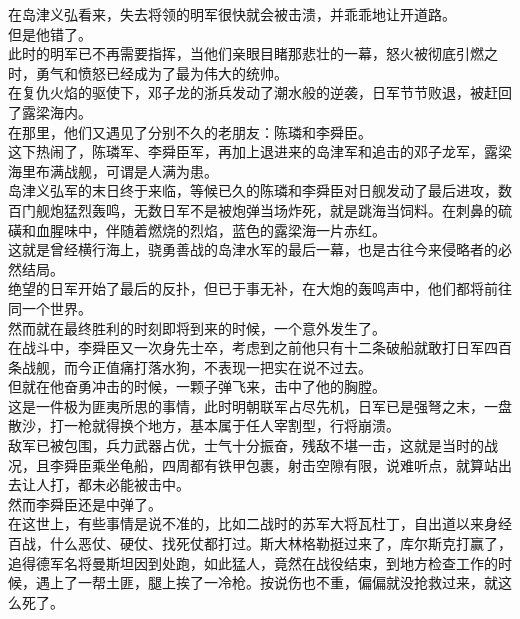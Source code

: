 \begin{multicols}{\theparacolNo}
在岛津义弘看来，失去将领的明军很快就会被击溃，并乖乖地让开道路。\\

但是他错了。\\

此时的明军已不再需要指挥，当他们亲眼目睹那悲壮的一幕，怒火被彻底引燃之时，勇气和愤怒已经成为了最为伟大的统帅。\\

在复仇火焰的驱使下，邓子龙的浙兵发动了潮水般的逆袭，日军节节败退，被赶回了露梁海内。\\

在那里，他们又遇见了分别不久的老朋友：陈璘和李舜臣。\\

这下热闹了，陈璘军、李舜臣军，再加上退进来的岛津军和追击的邓子龙军，露梁海里布满战舰，可谓是人满为患。\\

岛津义弘军的末日终于来临，等候已久的陈璘和李舜臣对日舰发动了最后进攻，数百门舰炮猛烈轰鸣，无数日军不是被炮弹当场炸死，就是跳海当饲料。在刺鼻的硫磺和血腥味中，伴随着燃烧的烈焰，蓝色的露梁海一片赤红。\\

这就是曾经横行海上，骁勇善战的岛津水军的最后一幕，也是古往今来侵略者的必然结局。\\

绝望的日军开始了最后的反扑，但已于事无补，在大炮的轰鸣声中，他们都将前往同一个世界。\\

然而就在最终胜利的时刻即将到来的时候，一个意外发生了。\\

在战斗中，李舜臣又一次身先士卒，考虑到之前他只有十二条破船就敢打日军四百条战舰，而今正值痛打落水狗，不表现一把实在说不过去。\\

但就在他奋勇冲击的时候，一颗子弹飞来，击中了他的胸膛。\\

这是一件极为匪夷所思的事情，此时明朝联军占尽先机，日军已是强弩之末，一盘散沙，打一枪就得换个地方，基本属于任人宰割型，行将崩溃。\\

敌军已被包围，兵力武器占优，士气十分振奋，残敌不堪一击，这就是当时的战况，且李舜臣乘坐龟船，四周都有铁甲包裹，射击空隙有限，说难听点，就算站出去让人打，都未必能被击中。\\

然而李舜臣还是中弹了。\\

在这世上，有些事情是说不准的，比如二战时的苏军大将瓦杜丁，自出道以来身经百战，什么恶仗、硬仗、找死仗都打过。斯大林格勒挺过来了，库尔斯克打赢了，追得德军名将曼斯坦因到处跑，如此猛人，竟然在战役结束，到地方检查工作的时候，遇上了一帮土匪，腿上挨了一冷枪。按说伤也不重，偏偏就没抢救过来，就这么死了。\\


\end{multicols}
